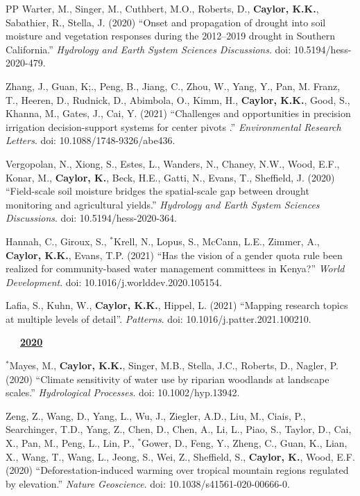 \documentclass[10pt]{report}
\begin{document}
\begin{etaremune}

\item [PP] Warter, M., Singer, M., Cuthbert, M.O., Roberts, D., \textbf{Caylor, K.K.}, Sabathier, R., Stella, J. (2020) ``Onset and propagation of drought into soil moisture and vegetation responses during the 2012–2019 drought in Southern California.'' {\em Hydrology and Earth System Sciences Discussions}. doi: 10.5194/hess-2020-479.

\item Zhang, J., Guan, K;., Peng, B., Jiang, C., Zhou, W., Yang, Y., Pan, M. Franz, T., Heeren, D., Rudnick, D., Abimbola, O., Kimm, H., \textbf{Caylor, K.K.}, Good, S., Khanna, M., Gates, J., Cai, Y. (2021) ``Challenges and opportunities in precision irrigation decision-support systems for center pivots .'' {\em Environmental Research Letters}. doi: 10.1088/1748-9326/abe436.

\item Vergopolan, N., Xiong, S., Estes, L., Wanders, N., Chaney, N.W., Wood, E.F., Konar, M., \textbf{Caylor, K.}, Beck, H.E., Gatti, N., Evans, T.,  Sheffield, J. (2020) ``Field-scale soil moisture bridges the spatial-scale gap between drought monitoring and agricultural yields.'' {\em Hydrology and Earth System Sciences Discussions}. doi: 10.5194/hess-2020-364.

\item Hannah, C., Giroux, S., $^{*}$Krell, N., Lopus, S., McCann, L.E., Zimmer, A., \textbf{Caylor, K.K.}, Evans, T.P. (2021) ``Has the vision of a gender quota rule been realized for community-based water management committees in Kenya?'' {\em World Development}. doi: 10.1016/j.worlddev.2020.105154.

\item Lafia, S., Kuhn, W., \textbf{Caylor, K.K.}, Hippel, L. (2021) ``Mapping research topics at multiple levels of detail''. {\em Patterns}. doi: 10.1016/j.patter.2021.100210.

\mbox{\ \ \ \underline{\textbf{2020}}}

\item $^{*}$Mayes, M., \textbf{Caylor, K.K.}, Singer, M.B., Stella, J.C., Roberts, D., Nagler, P. (2020) ``Climate sensitivity of water use by riparian woodlands at landscape scales.'' {\em Hydrological Processes}. doi: 10.1002/hyp.13942.

\item Zeng, Z., Wang, D., Yang, L.,  Wu, J.,  Ziegler, A.D., Liu, M., Ciais, P., Searchinger, T.D., Yang, Z., Chen, D., Chen, A., Li, L., Piao, S., Taylor, D., Cai, X., Pan, M., Peng, L., Lin, P., $^{*}$Gower, D., Feng, Y.,  Zheng, C., Guan, K., Lian, X., Wang, T., Wang, L., Jeong, S., Wei, Z., Sheffield, S., \textbf{Caylor, K.}, Wood, E.F. (2020) ``Deforestation-induced warming over tropical mountain regions regulated by elevation.'' {\em Nature Geoscience}. doi: 10.1038/s41561-020-00666-0.
 

\end{etaremune}
\end{document}
